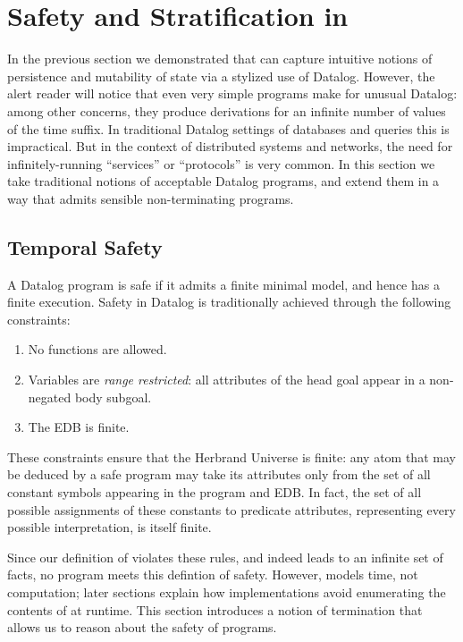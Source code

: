 \section{Safety and Stratification in \large \bf \slang}
In the previous section we demonstrated that \slang can capture intuitive notions of persistence and mutability of state via a stylized use of Datalog.  However, the alert reader will notice that even very simple \slang programs make for unusual Datalog: among other concerns, they produce derivations for an infinite number of values of the time suffix.  In traditional Datalog settings of databases and queries this is impractical.  But in the context of distributed systems and networks, the need for infinitely-running ``services'' or ``protocols'' is very common. In this section we take traditional notions of acceptable Datalog programs, and extend them in a way that admits sensible non-terminating programs.

\subsection{Temporal Safety}
A Datalog program is safe if it admits a finite minimal model, and hence has
a finite execution.  Safety in Datalog is traditionally achieved
through the following constraints:

\begin{enumerate}
%
\item No functions are allowed.
%
\item Variables are \emph{range restricted}: all attributes of the head goal
appear in a non-negated body subgoal.
%
\item The EDB is finite.
%
\end{enumerate}

These constraints ensure that the Herbrand Universe is finite: any atom that
may be deduced by a safe program may take its attributes only from the 
set of all constant symbols appearing in the program and EDB.
In fact, the set of all possible assignments of these constants to predicate
attributes, representing every possible interpretation, is itself finite. 


Since our definition of  violates these rules, and
indeed leads to an infinite set of facts, no \slang program meets this
defintion of safety.  However,  models time, not
computation; later sections explain how \lang implementations avoid
enumerating the contents of  at runtime.  This
section introduces a notion of termination that
allows us to reason about the safety of \slang programs.

